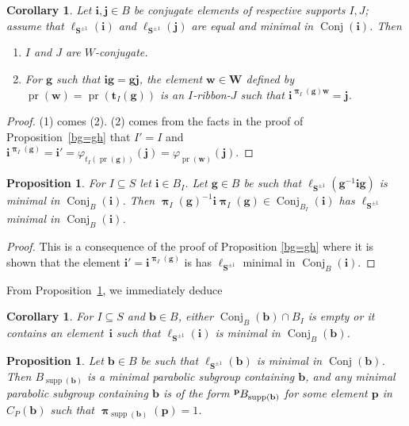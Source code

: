 \documentclass{amsart}
\numberwithin{equation}{section}
\newtheorem{proposition}[equation]{Proposition}
\newtheorem{corollary}[equation]{Corollary}
\newcommand\lexp[2]{\kern\scriptspace\vphantom{#2}^{#1}\kern-\scriptspace#2}
\newcommand\lS{{\ell_{\bS^{\pm1}}}}
\newcommand\inv{^{-1}}
\newcommand\bb{{\mathbf b}}
\newcommand\bg{{\mathbf g}}
\newcommand\bi{{\mathbf i}}
\newcommand\bj{{\mathbf j}}
\newcommand\bp{{\mathbf p}}
\newcommand\bt{{\mathbf t}}
\newcommand\bw{{\mathbf w}}
\newcommand\bS{{\mathbf S}}
\newcommand\bW{{\mathbf W}}
\DeclareMathOperator\pr{pr}
\DeclareMathOperator\bpi{\boldsymbol\pi}
\DeclareMathOperator\supp{supp}
\DeclareMathOperator\conj{Conj}
\begin{document}
\begin{corollary} \label{corollary}
Let $\bi,\bj\in  B$ be conjugate elements of respective supports $I,J$;
assume that $\lS(\bi)$ and $\lS(\bj)$ are equal and minimal in $\conj(\bi)$. Then
\begin{enumerate}
\item $I$ and $J$  are $W$-conjugate.
\item For $\bg$ such that $\bi\bg=\bg\bj$, 
the element $\bw\in\bW$ defined by $\pr(\bw)=\pr(\bt_I(\bg))$ is an 
$I$-ribbon-$J$ such that $\bi^{\bpi_I(\bg)\bw}=\bj$.
\end{enumerate}
\end{corollary}
\begin{proof}
(1) comes (2). (2) comes from the facts in the proof of
 Proposition~\ref{bg=gh} that $I'=I$ and $\bi^{\bpi_I(\bg)}=\bi'=\varphi_{t_I(\pr(\bg))}(\bj)=
 \varphi_{\pr(\bw)}(\bj)$.
\end{proof}
\begin{proposition} \label{conj min V2}
For $I\subseteq S$ let $\bi\in B_I$. Let $\bg\in B$ be such that 
$\lS(\bg\inv\bi\bg)$ is minimal in $\conj_B(\bi)$.
Then $\bpi_I(\bg)\inv\bi\bpi_I(\bg)\in\conj_{B_I}(\bi)$ has $\lS$ minimal
in $\conj_B(\bi)$.
\end{proposition}
\begin{proof}
This is a consequence of the proof of Proposition \ref{bg=gh} where
it is shown that the element $\bi'=\bi^{\bpi_I(\bg)}$ is has $\lS$ minimal in $\conj_B(\bi)$.
\end{proof}
From Proposition~\ref{conj min V2},  we immediately deduce
\begin{corollary}\label{min in conj} For $I\subseteq S$ and $\bb\in B$, 
either $\conj_B(\bb)\cap B_I$ is empty or it contains an element~$\bi$
such that $\lS(\bi)$ is minimal in $\conj_B(\bb)$. 
\end{corollary}
\begin{proposition}\label{minimal  support}  Let  $\bb\in  B$  be such that
$\lS(\bb)$  is minimal in $\conj(\bb)$.  Then $B_{\supp(\bb)}$ is a minimal
parabolic subgroup containing $\bb$, and any minimal parabolic subgroup
containing $\bb$ is of the form $\lexp{\bp}B_{\supp(\bb)}$ for some element
$\bp$ in $C_P(\bb)$ such that $\bpi_{\supp(\bb)}(\bp)=1$.
\end{proposition}
\end{document}
